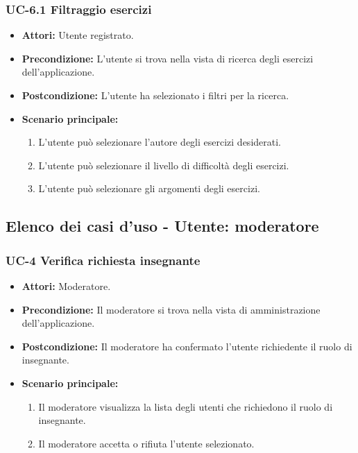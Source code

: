 \subsubsection{UC-6.1 Filtraggio esercizi }
\begin{itemize}
\item \textbf{Attori:} Utente registrato.
			\item \textbf{Precondizione:} L'utente si trova nella vista di ricerca degli esercizi dell'applicazione.
			\item \textbf{Postcondizione:} L'utente ha selezionato i filtri per la ricerca.
			\item \textbf{Scenario principale:}
				\begin{enumerate}
					\item L'utente può selezionare l'autore degli esercizi desiderati.
					\item L'utente può selezionare il livello di difficoltà degli esercizi.
					\item L'utente può selezionare gli argomenti degli esercizi.
				\end{enumerate}

\end{itemize}

\subsection{Elenco dei casi d'uso - Utente: moderatore}	
\subsubsection{UC-4 Verifica richiesta insegnante}
		\begin{itemize}
			\item \textbf{Attori:} Moderatore.
			\item \textbf{Precondizione:} Il moderatore si trova nella vista di amministrazione dell'applicazione.
			\item \textbf{Postcondizione:} Il moderatore ha confermato l'utente richiedente il ruolo di insegnante.
			\item \textbf{Scenario principale:}
				\begin{enumerate}
					\item Il moderatore visualizza la lista degli utenti che richiedono il ruolo di insegnante.
					\item Il moderatore accetta o rifiuta l'utente selezionato.
				\end{enumerate}
		\end{itemize}
		
